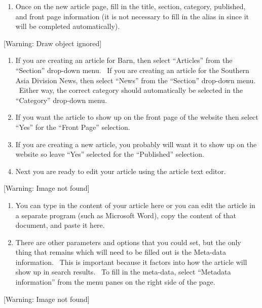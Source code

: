 \documentclass[12pt,twoside]{article}
\newcounter{saveenum}
\newcommand\liststyleLi{%
\renewcommand\theenumi{\arabic{enumi}}
\renewcommand\theenumii{\arabic{enumii}}
\renewcommand\theenumiii{\arabic{enumiii}}
\renewcommand\theenumiv{\arabic{enumiv}}
\renewcommand\labelenumi{1.\theenumi)}
\renewcommand\labelenumii{\theenumii.}
\renewcommand\labelenumiii{\theenumiii.}
\renewcommand\labelenumiv{\theenumiv.}
}
\begin{document}
\liststyleLi
\setcounter{saveenum}{\value{enumi}}
\begin{enumerate}
\setcounter{enumi}{\value{saveenum}}
\item {
Once on the new article page, fill in the title, section, category,
published, and front page information (it is not necessary to fill in
the alias in since it will be completed automatically).}
\end{enumerate}
{\centering{}
[Warning: Draw object ignored]
\par}

\liststyleLi
\setcounter{saveenum}{\value{enumi}}
\begin{enumerate}
\setcounter{enumi}{\value{saveenum}}
\item {
If you are creating an article for Barn, then select ``Articles'' from
the ``Section'' drop{}-down menu. \ If you are creating an article for
the Southern Asia Division News, then select ``News'' from the
``Section'' drop{}-down menu. \ Either way, the correct category should
automatically be selected in the ``Category'' drop{}-down menu.}
\item {
If you want the article to show up on the front page of the website then
select ``Yes'' for the ``Front Page'' selection.}
\item {
If you are creating a new article, you probably will want it to show up
on the website so leave ``Yes'' selected for the ``Published''
selection.}
\item {
Next you are ready to edit your article using the article text editor.}
\end{enumerate}
{\centering{}
 [Warning: Image not found] 
\par}

\liststyleLi
\setcounter{saveenum}{\value{enumi}}
\begin{enumerate}
\setcounter{enumi}{\value{saveenum}}
\item {
You can type in the content of your article here or you can edit the
article in a separate program (such as Microsoft Word), copy the
content of that document, and paste it here.}
\item {
There are other parameters and options that you could set, but the only
thing that remains which will need to be filled out is the Meta-data
information. \ This is important because it factors into how the
article will show up in search results. \ To fill in the meta-data,
select ``Metadata information'' from the menu panes on the right side
of the page.}
\end{enumerate}
{\centering{}
 [Warning: Image not found] 
\par}
\end{document}
